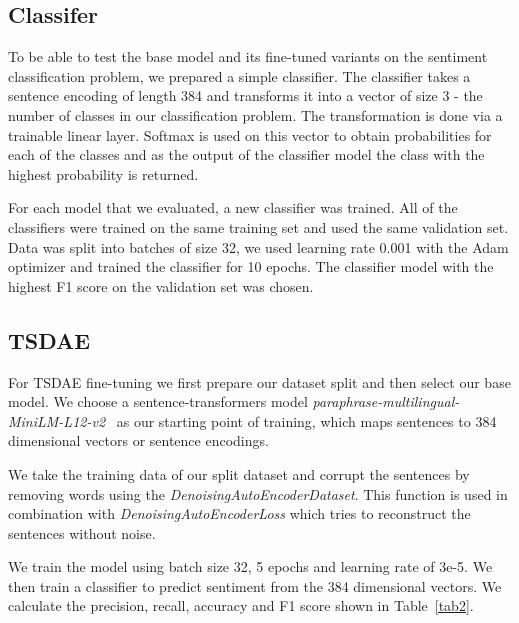 \documentclass[fleqn,moreauthors,10pt]{ds_report}
\begin{document}


\subsection*{Classifer}

To be able to test the base model and its fine-tuned variants on the sentiment classification problem, we prepared a simple classifier. The classifier takes a sentence encoding of length 384 and transforms it into a vector of size 3 - the number of classes in our classification problem. The transformation is done via a trainable linear layer. Softmax is used on this vector to obtain probabilities for each of the classes and as the output of the classifier model the class with the highest probability is returned.

For each model that we evaluated, a new classifier was trained. All of the classifiers were trained on the same training set and used the same validation set. Data was split into batches of size 32, we used learning rate 0.001 with the Adam optimizer and trained the classifier for 10 epochs. The classifier model with the highest F1 score on the validation set was chosen.


\subsection*{TSDAE}

For TSDAE fine-tuning we first prepare our dataset split and then select our base model.
We choose a sentence-transformers model {\it paraphrase-multilingual-MiniLM-L12-v2}~\cite{reimers-2019-sentence-bert} as our starting point of training,
which maps sentences to 384 dimensional vectors or sentence encodings.

We take the training data of our split dataset and corrupt the sentences by removing words using the {\it DenoisingAutoEncoderDataset}. This function is used in combination with {\it DenoisingAutoEncoderLoss} which tries to reconstruct the sentences without noise.

We train the model using batch size 32, 5 epochs and learning rate of 3e-5. We then train a classifier to predict sentiment from the 384 dimensional vectors. We calculate the precision, recall, accuracy and F1 score shown in Table~\ref{tab2}.
\end{document}
